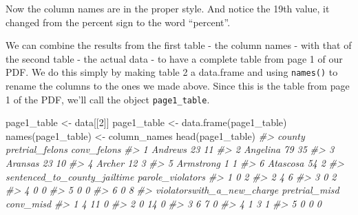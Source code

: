 \documentclass[
]{krantz}
\makeatletter
\newenvironment{Shaded}{\begin{snugshade}}{\end{snugshade}}
\newcommand{\CommentTok}[1]{\textcolor[rgb]{0.37,0.37,0.37}{\textit{#1}}}
\newcommand{\DecValTok}[1]{\textcolor[rgb]{0.06,0.06,0.06}{#1}}
\newcommand{\FunctionTok}[1]{\textcolor[rgb]{0,0,0}{#1}}
\newcommand{\NormalTok}[1]{#1}
\newcommand{\OtherTok}[1]{\textcolor[rgb]{0.37,0.37,0.37}{#1}}
\newenvironment{kframe}{%
\medskip{}
\setlength{\fboxsep}{.8em}
 \def\at@end@of@kframe{}%
 \ifinner\ifhmode%
  \def\at@end@of@kframe{\end{minipage}}%
  \begin{minipage}{\columnwidth}%
 \fi\fi%
 \def\FrameCommand##1{\hskip\@totalleftmargin \hskip-\fboxsep
 \colorbox{shadecolor}{##1}\hskip-\fboxsep
     \hskip-\linewidth \hskip-\@totalleftmargin \hskip\columnwidth}%
 \MakeFramed {\advance\hsize-\width
   \@totalleftmargin\z@ \linewidth\hsize
   \@setminipage}}%
 {\par\unskip\endMakeFramed%
 \at@end@of@kframe}
\renewenvironment{Shaded}{\begin{kframe}}{\end{kframe}}
\makeatother
\begin{document}
Now the column names are in the proper style. And notice the 19th value, it changed from the percent sign to the word ``percent''.

We can combine the results from the first table - the column names - with that of the second table - the actual data - to have a complete table from page 1 of our PDF. We do this simply by making table 2 a data.frame and using \texttt{names()} to rename the columns to the ones we made above. Since this is the table from page 1 of the PDF, we'll call the object \texttt{page1\_table}.

\begin{Shaded}
\begin{Highlighting}[]
\NormalTok{page1\_table }\OtherTok{\textless{}{-}}\NormalTok{ data[[}\DecValTok{2}\NormalTok{]]}
\NormalTok{page1\_table }\OtherTok{\textless{}{-}} \FunctionTok{data.frame}\NormalTok{(page1\_table)}
\FunctionTok{names}\NormalTok{(page1\_table) }\OtherTok{\textless{}{-}}\NormalTok{ column\_names}
\FunctionTok{head}\NormalTok{(page1\_table)}
\CommentTok{\#\textgreater{}      county pretrial\_felons conv\_felons}
\CommentTok{\#\textgreater{} 1   Andrews              23          11}
\CommentTok{\#\textgreater{} 2  Angelina              79          35}
\CommentTok{\#\textgreater{} 3   Aransas              23          10}
\CommentTok{\#\textgreater{} 4    Archer              12           3}
\CommentTok{\#\textgreater{} 5 Armstrong               1           1}
\CommentTok{\#\textgreater{} 6  Atascosa              54           2}
\CommentTok{\#\textgreater{}   sentenced\_to\_county\_jailtime parole\_violators}
\CommentTok{\#\textgreater{} 1                            0                2}
\CommentTok{\#\textgreater{} 2                            4                6}
\CommentTok{\#\textgreater{} 3                            0                2}
\CommentTok{\#\textgreater{} 4                            0                0}
\CommentTok{\#\textgreater{} 5                            0                0}
\CommentTok{\#\textgreater{} 6                            0                8}
\CommentTok{\#\textgreater{}   violatorswith\_a\_new\_charge pretrial\_misd conv\_misd}
\CommentTok{\#\textgreater{} 1                          4            11         0}
\CommentTok{\#\textgreater{} 2                          0            14         0}
\CommentTok{\#\textgreater{} 3                          6             7         0}
\CommentTok{\#\textgreater{} 4                          1             3         1}
\CommentTok{\#\textgreater{} 5                          0             0         0}

\end{Highlighting}
\end{Shaded}
\end{document}
